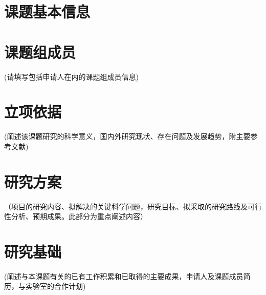 \documentclass{sklcApplicant}
\begin{document}
\maketitle
\restoregeometry
\linespread{1.25}
\section{课题基本信息}
\BasicInformation

\section{课题组成员}
{\kaishu{} (请填写包括申请人在内的课题组成员信息)}
\vspace{-1.5em}

\vspace{-4em}
\section{立项依据}
{\kaishu{} (阐述该课题研究的科学意义，国内外研究现状、存在问题及发展趋势，附主要参考文献)}


\renewcommand\refname{\zihao{3}\heiti 主要参考文献}


\section{研究方案}
{\kaishu{} （项目的研究内容、拟解决的关键科学问题，研究目标、拟采取的研究路线及可行性分析、预期成果。此部分为重点阐述内容）}






\section{研究基础}
{\kaishu{} (阐述与本课题有关的已有工作积累和已取得的主要成果，申请人及课题成员简历，与实验室的合作计划)}



\clearpage
\end{document}
